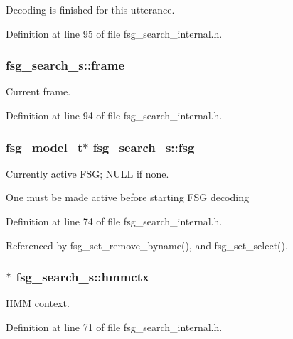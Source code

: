 Decoding is finished for this utterance. 



Definition at line 95 of file fsg\-\_\-search\-\_\-internal.\-h.

\subsubsection[{frame}]{ fsg\-\_\-search\-\_\-s\-::frame}\label{structfsg__search__s_acdac4164d14d531b14c11a823dd22893}


Current frame. 



Definition at line 94 of file fsg\-\_\-search\-\_\-internal.\-h.

\subsubsection[{fsg}]{\setlength{\rightskip}{0pt plus 5cm}fsg\-\_\-model\-\_\-t$\ast$ fsg\-\_\-search\-\_\-s\-::fsg}\label{structfsg__search__s_ab1877ffe7d77ddb79bab53fb95577946}


Currently active F\-S\-G; N\-U\-L\-L if none. 

One must be made active before starting F\-S\-G decoding 

Definition at line 74 of file fsg\-\_\-search\-\_\-internal.\-h.



Referenced by fsg\-\_\-set\-\_\-remove\-\_\-byname(), and fsg\-\_\-set\-\_\-select().

\subsubsection[{hmmctx}]{$\ast$ fsg\-\_\-search\-\_\-s\-::hmmctx}\label{structfsg__search__s_a7407bdf5f311caf9d46817b3387b798c}


H\-M\-M context. 



Definition at line 71 of file fsg\-\_\-search\-\_\-internal.\-h.

